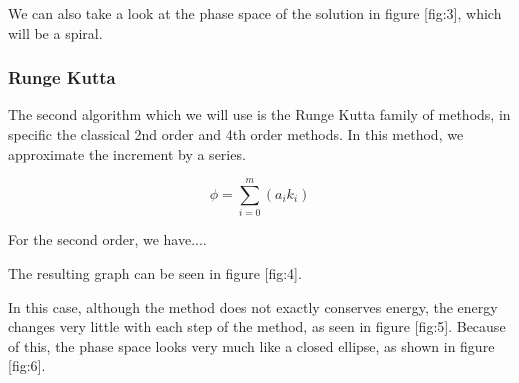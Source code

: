 
We can also take a look at the phase space of the solution in figure [fig:3], which will be a spiral.


\subsubsection{Runge Kutta}

The second algorithm which we will use is the Runge Kutta family of methods, in specific the classical 2nd order and 4th order methods. In this method, we approximate the increment by a series.

$$\phi = \sum_{i=0}^{m}(a_i k_i)$$

For the second order, we have....

The resulting graph can be seen in figure [fig:4].


In this case, although the method does not exactly conserves energy, the energy changes very little with each step of the method, as seen in figure [fig:5]. Because of this, the phase space looks very much like a closed ellipse, as shown in figure [fig:6].



